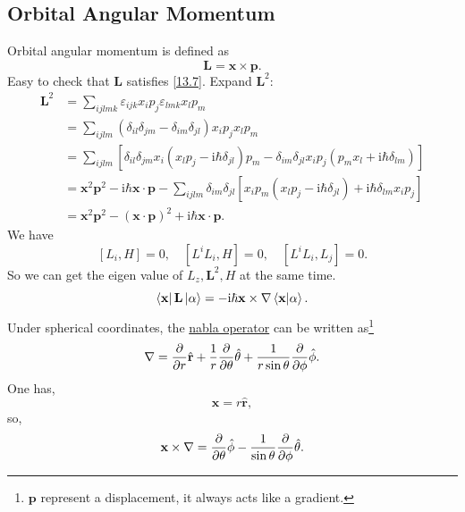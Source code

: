 \documentclass{article}
\theoremstyle{1}
\newcommand{\ii}{\mathrm{i}}
\begin{document}
\subsection{Orbital Angular Momentum}
Orbital angular momentum is defined as
\begin{equation}
    \mathbf{L}=\mathbf{x}\times \mathbf{p}.
\end{equation}
Easy to check that $\mathbf{L}$ satisfies \eqref{13.7}.
Expand $\mathbf{L}^2$:
\begin{equation}
\begin{aligned}
\mathbf{L}^2 &= \sum_{ijlmk} \varepsilon_{ijk}x_i p_j \varepsilon_{lmk}x_l p_m \\
&= \sum_{ijlm} (\delta_{il}\delta_{jm} - \delta_{im}\delta_{jl})x_i p_j x_l p_m \\
&= \sum_{ijlm} [\delta_{il}\delta_{jm}x_i (x_l p_j - \ii\hbar\delta_{jl})p_m - \delta_{im}\delta_{jl}x_i p_j(p_m x_l + \ii\hbar\delta_{lm})]  \\
&= \mathbf{x}^2 \mathbf{p}^2 - \ii\hbar \mathbf{x} \cdot \mathbf{p} - \sum_{ijlm} \delta_{im}\delta_{jl}[x_i p_m(x_l p_j - \ii\hbar\delta_{jl}) + \ii\hbar\delta_{lm}x_i p_j] \\
&= \mathbf{x}^2 \mathbf{p}^2 - (\mathbf{x} \cdot \mathbf{p})^2 + \ii\hbar \mathbf{x} \cdot \mathbf{p}.
\end{aligned}
\end{equation}
We have 
\begin{equation}
    \left[L_i,H\right]=0,\quad \left[L^iL_i,H\right]=0,\quad \left[L^iL_i,L_j\right]=0.
\end{equation}
So we can get the eigen value of $L_z, \mathbf{L}^2, H$ at the same time.
\begin{equation}
    \bra{\mathbf{x}}\mathbf{L}\ket{\alpha}=-\ii \hbar \mathbf{x}\times\nabla\braket{\mathbf{x}}{\alpha}.
\end{equation}
Under spherical coordinates, the \href{run:Nabla Operator.pdf alias}{nabla operator} can be written as\footnote{$\mathbf{p}$ represent a displacement, it always acts like a gradient.}
\begin{equation}
    \nabla=\pdv{r}\hat{\mathbf{r}}+\frac{1}{r}\pdv{\theta}\hat{\mathbf{\theta}}+\frac{1}{r\sin\theta}\pdv{\phi}\hat{\mathbf{\phi}}.
\end{equation}
One has,
\begin{equation}
    \mathbf{x}=r \hat{\mathbf{r}},
\end{equation}
so, 
\begin{equation}
    \mathbf{x}\times\nabla=\pdv{\theta}\hat{\mathbf{\phi}}-\frac{1}{\sin\theta}\pdv{\phi}\hat{\mathbf{\theta}}.
\end{equation}
\end{document}
